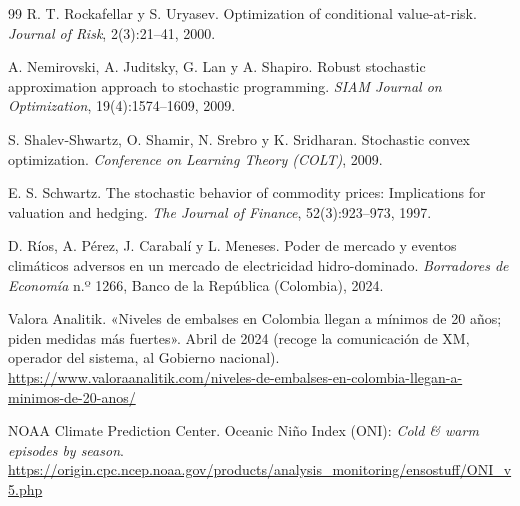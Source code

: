 \documentclass[11pt,a4paper,oneside]{book}
\theoremstyle{definition}
\theoremstyle{remark}
\begin{document}
\begin{thebibliography}{99}
 R. T. Rockafellar y S. Uryasev. Optimization of conditional value-at-risk. \emph{Journal of Risk},
2(3):21--41, 2000.

 A. Nemirovski, A. Juditsky, G. Lan y A. Shapiro. Robust stochastic approximation approach to
stochastic programming. \emph{SIAM Journal on Optimization}, 19(4):1574--1609, 2009.

 S. Shalev-Shwartz, O. Shamir, N. Srebro y K. Sridharan. Stochastic convex optimization.
\emph{Conference on Learning Theory (COLT)}, 2009.

 E. S. Schwartz. The stochastic behavior of commodity prices: Implications for valuation and
hedging. \emph{The Journal of Finance}, 52(3):923--973, 1997.

 D. Ríos, A. Pérez, J. Carabalí y L. Meneses. Poder de mercado y eventos climáticos adversos en un
mercado de electricidad hidro-dominado. \emph{Borradores de Economía} n.º 1266, Banco de la República (Colombia), 2024.

 Valora Analitik. «Niveles de embalses en Colombia llegan a mínimos de 20 años; piden medidas más
fuertes». Abril de 2024 (recoge la comunicación de XM, operador del sistema, al Gobierno nacional).
\url{https://www.valoraanalitik.com/niveles-de-embalses-en-colombia-llegan-a-minimos-de-20-anos/}

 NOAA Climate Prediction Center. Oceanic Niño Index (ONI): \emph{Cold \& warm episodes by season}.
\url{https://origin.cpc.ncep.noaa.gov/products/analysis_monitoring/ensostuff/ONI_v5.php}

\end{thebibliography}
\end{document}
